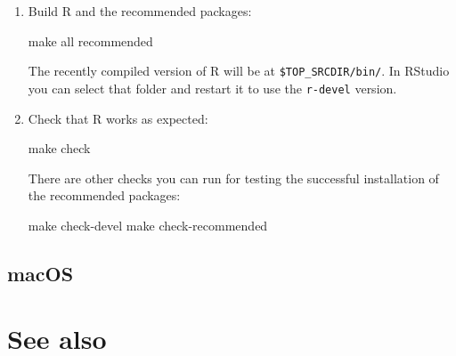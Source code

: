 \documentclass[
]{book}
\newenvironment{Shaded}{\begin{snugshade}}{\end{snugshade}}
\newcommand{\BuiltInTok}[1]{#1}
\newcommand{\FunctionTok}[1]{\textcolor[rgb]{0.00,0.00,0.00}{#1}}
\newcommand{\NormalTok}[1]{#1}
\newcommand{\StringTok}[1]{\textcolor[rgb]{0.31,0.60,0.02}{#1}}
\newcommand{\VariableTok}[1]{\textcolor[rgb]{0.00,0.00,0.00}{#1}}
\begin{document}
\begin{enumerate}
\begin{Shaded}
\end{Shaded}
\item
  Build R and the recommended packages:

\begin{Shaded}
\begin{Highlighting}[]
\FunctionTok{make}\NormalTok{ all recommended}
\end{Highlighting}
\end{Shaded}

  The recently compiled version of R will be at \texttt{\$TOP\_SRCDIR/bin/}.
  In RStudio you can select that folder and restart it to use the \texttt{r-devel} version.
\item
  Check that R works as expected:

\begin{Shaded}
\begin{Highlighting}[]
\FunctionTok{make}\NormalTok{ check}
\end{Highlighting}
\end{Shaded}

  There are other checks you can run for testing the successful installation of the recommended packages:

\begin{Shaded}
\begin{Highlighting}[]
\FunctionTok{make}\NormalTok{ check{-}devel}
\FunctionTok{make}\NormalTok{ check{-}recommended}
\end{Highlighting}
\end{Shaded}
\end{enumerate}

\hypertarget{macos}{%
\subsection{macOS}\label{macos}}

\hypertarget{see-also}{%
\section{See also}\label{see-also}}
\end{document}
